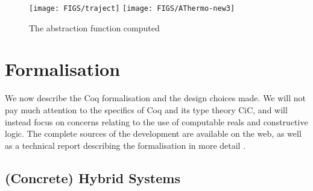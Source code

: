 \documentclass[runningheads]{llncs}
\newcommand{\ADAM}[1] {\todo{\textsc{Adam says}: #1}}
\newcommand{\weg}[1]{}
\newcommand{\doubleheadrightarrow}{\mathrel{\rightarrow\!\!\!\!\rightarrow}}
\newcommand{\attrans}{\stackrel{A}{\doubleheadrightarrow_{CD}}}
\newcommand{\acontrans}{\stackrel{A}{\rightarrow_C}}
\newcommand{\adistrans}{\stackrel{A}{\rightarrow_D}}
\begin{document}
\begin{center}
\begin{figure}[htb!]
    \texttt{[image: FIGS/traject]}
    \texttt{[image: FIGS/AThermo-new3]}
\caption{The abstraction function computed
\label{fig:abstraction}}
\end{figure}
\end{center}
\weg{ %
There is a slight subtlety with the abstract transitions that we want
to consider. If we just take $\attrans$ to be the reflexive transitive
closure of $\acontrans \cup \adistrans$, we get far too many abstract
traces. (There is no problem with the correctness of the method --
Figure \ref{diag:abstraction} still applies -- but we get way too many
traces to be able to prove any system safe.) The problem lies in the
fact that there is no transition from any point in $[0.5,1)
  \times[5,6)$ to $[0.5,1) \times[9,10)$, but the transitive closure
        of $\adistrans$ gives us such a transition anyway.
}
\section{Formalisation}
We now describe the Coq formalisation and the design choices made.  We
will not pay much attention to the specifics of Coq and its type
theory CiC, and will instead focus on concerns relating to the use of
computable reals and constructive logic.  The complete sources of the
development are available on the web, as well as a technical report
describing the formalisation in more detail \cite{hybrid-techreport}.

\subsection{(Concrete) Hybrid Systems}
\label{concrete}
\end{document}
